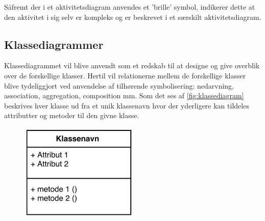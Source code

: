 Såfremt der i et aktivitetsdiagram anvendes et 'brille' symbol, indikerer dette at den aktivitet i sig selv er kompleks og er beskrevet i et særskilt aktivitetsdiagram.  

\subsection{Klassediagrammer}
Klassediagrammet vil blive anvendt som et redskab til at designe og give overblik over de forskellige klasser. Hertil vil relationerne mellem de forskellige klasser blive tydeliggjort ved anvendelse af tilhørende symbolisering: nedarvning, association, aggregation, composition mm. Som det ses af \autoref{fig:klassediagram} beskrives hver klasse ud fra et unik klassenavn hvor der yderligere kan tildeles attributter og metoder til den givne klasse. \cite{Fowler2004} 

\begin{figure} [H]
\centering
\includegraphics[width=0.5\textwidth]{figures/klassediag}
\caption{}
\label{fig:klassediagram}
\end{figure}